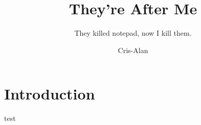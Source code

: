 \documentclass{article}
\title{They're After Me}
\author{They killed notepad, now I kill them.}
\date{Cris-Alan}
\begin{document}
\maketitle
\pagestyle{fancy}
\thispagestyle{fancy}
\section{Introduction}
test
\end{document}
